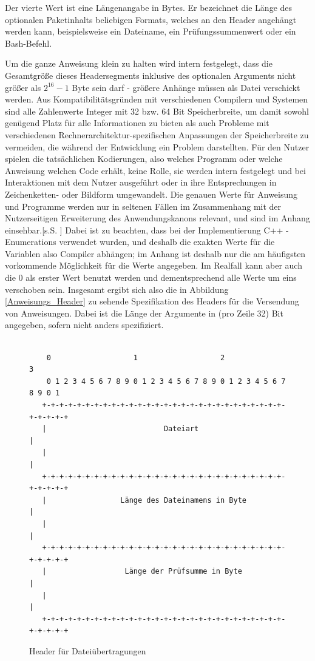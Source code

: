 Der vierte Wert ist eine Längenangabe in Bytes.
Er bezeichnet die Länge des optionalen Paketinhalts beliebigen Formats, welches an den Header angehängt werden kann, beispielsweise ein Dateiname, ein Prüfungssummenwert oder ein Bash-Befehl.\par
Um die ganze Anweisung klein zu halten wird intern festgelegt, dass die Gesamtgröße dieses Headersegments inklusive des optionalen Arguments nicht größer als $2^{16}-1$ Byte sein darf - größere Anhänge müssen als Datei verschickt werden.
Aus Kompatibilitätsgründen mit verschiedenen Compilern und Systemen sind alle Zahlenwerte Integer mit 32 bzw. 64 Bit Speicherbreite, um damit sowohl genügend Platz für alle Informationen zu bieten als auch Probleme mit verschiedenen Rechnerarchitektur-spezifischen Anpassungen der Speicherbreite zu vermeiden, die während der Entwicklung ein Problem darstellten.
Für den Nutzer spielen die tatsächlichen Kodierungen, also welches Programm oder welche Anweisung welchen Code erhält, keine Rolle, sie werden intern festgelegt und bei  Interaktionen mit dem Nutzer ausgeführt oder in ihre Entsprechungen in Zeichenketten- oder Bildform umgewandelt.
Die genauen Werte für Anweisung und Programme werden nur in seltenen Fällen im Zusammenhang mit der Nutzerseitigen Erweiterung des Anwendungskanons relevant, und sind im Anhang einsehbar.[s.S. \pageref{enums}]
Dabei ist zu beachten, dass bei der Implementierung C++ - Enumerations verwendet wurden, und deshalb die exakten Werte für die Variablen also Compiler abhängen; im Anhang ist deshalb nur die am häufigsten vorkommende Möglichkeit für die Werte angegeben. 
Im Realfall kann aber auch die 0 als erster Wert benutzt werden und dementsprechend alle Werte um eins verschoben sein.
Insgesamt ergibt sich also die in Abbildung \ref{Anweisungs_Header} zu sehende Spezifikation des Headers für die Versendung von Anweisungen.
Dabei ist die Länge der Argumente in (pro Zeile 32) Bit angegeben, sofern nicht anders spezifiziert.\\\\

\begin{figure}[h]
\begin{lstlisting}
	0                   1                   2                   3
    0 1 2 3 4 5 6 7 8 9 0 1 2 3 4 5 6 7 8 9 0 1 2 3 4 5 6 7 8 9 0 1
   +-+-+-+-+-+-+-+-+-+-+-+-+-+-+-+-+-+-+-+-+-+-+-+-+-+-+-+-+-+-+-+-+
   |                           Dateiart                            |
   |                                                               |
   +-+-+-+-+-+-+-+-+-+-+-+-+-+-+-+-+-+-+-+-+-+-+-+-+-+-+-+-+-+-+-+-+
   |                 Länge des Dateinamens in Byte                 |
   |                                                               |
   +-+-+-+-+-+-+-+-+-+-+-+-+-+-+-+-+-+-+-+-+-+-+-+-+-+-+-+-+-+-+-+-+
   |                  Länge der Prüfsumme in Byte                  |
   |                                                               |
   +-+-+-+-+-+-+-+-+-+-+-+-+-+-+-+-+-+-+-+-+-+-+-+-+-+-+-+-+-+-+-+-+
\end{lstlisting}
\caption{Header für Dateiübertragungen}
\label{Datei_Header}
\end{figure}

